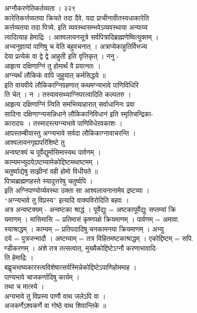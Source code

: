 \documentclass[11pt, openany]{book}
\begin{document}
{{{{{{{{{{{{{{{{{{{{{{{{{{{{{{{{{{{{{{{{{{{{{{{{{{{{{{{{{{{{{{{{{{{{{{{{{{{{{{{{{{{{{{{{{{{{{{{{{{{{{{{{{{{{{{{{{{{{{{{{{{{{{{{{{{{ }{ अग्नौकरणेतिकर्तव्यता । २२९}{\\
कारेतिकर्त्तव्यतया क्रियते तदा दैवे, यदा प्राचीनावीतस्वधाकारेति\\
कर्त्तव्यतया तदा पित्र्ये, इति व्यवस्थासम्भवेऽव्यवस्थाया अन्याय्य\\
त्वादित्याह हेमाद्रिः । आश्वलायनसूत्रे
सर्वपित्रादिब्राह्मणेष्वित्युक्तम् ।\\
अभ्यनुज्ञायां पाणिषु च वेति बहुवचनात् । अत्राप्येकाहुतिर्विभज्य\\
देया प्रत्येकं वा द्वे द्वे आहुती इति वृत्तिकृत् । ननु -\\
आहृत्य दक्षिणाग्निं तु होमार्थं वै प्रयत्नतः ।\\
अग्न्यर्थं लौकिकं वापि जुहुयात् कर्मसिद्धये ॥\\
इति वायवीये लौकिकाग्निग्रहणात् कथमग्न्यभावे पाणिविधिरि\\
ति चेत् । न । तस्यावसथ्याग्निपरत्वादिति कल्पतरु ।\\
आहृत्य दक्षिणाग्निं त्विति समभिव्याहारात् सर्वाधानिनः प्रवा\\
सादिना दक्षिणाग्न्यसन्निधाने लौकिकानिविधानं इति स्मृतिचन्द्रिका-\\
कारादयः । तस्मादस्त्यग्न्यभावे पाणिविधेरवकाशः ।\\
आपस्तम्बीयास्तु अग्न्यभावे सर्वदा लौकिकाग्नावाचरन्ति ।\\
आश्वलायनगृह्यपरिशिष्टे तु\\
अन्वष्टक्यं च पूर्वेद्युर्मासिमास्यथ पार्वणम् ।\\
काम्यमभ्युदयेऽष्टम्यामेकोद्दिष्टमथाष्टमम् ।\\
चतुर्ष्वाद्येषु साझीनां वही होमो विधीयते ॥\\
पित्र्यब्राह्मणहस्ते स्यादुत्तरेषु चतुर्ष्वपि ।\\
इति अग्निपाण्योर्व्यवस्था उक्ता सा आश्वलायनानामेव द्रष्टव्या ।\\
``अग्न्यभावे तु विप्रस्य'' इत्यादि वाक्यविरोदिति बहवः ।\\
अत्र अन्वष्टक्यम् - अन्वष्टका श्राद्धं । पूर्वेद्युः = अष्टकापूर्वेद्युः
सप्तम्यां क्रि\\
यमाणम् । मासिमासि = प्रतिमासं कृष्णपक्षे क्रियमाणम् । पार्वणम् =
अमावा.\\
स्याश्राद्धम् । काम्यम् = प्रतिपदादिषु चनकामनया क्रियमाणम् । अभ्यु\\
दये = पुत्रजन्मादौ । अष्टम्याम् = तत्र विहितमष्टकाश्राद्धम् ।
एकोद्दिष्टम् = सपि.\\
ण्डीकरणम् । अंशे तत्र तत्सत्वात्, मुख्यैकोद्दिष्टेऽग्नौ करणाभावादि-\\
ति हेमाद्रिः ।\\
बह्वृचभाष्यकारस्त्वविशेषात्सर्वस्मिन्नेकोद्दिष्टेऽपाणिहोममाह ।\\
पाण्यभावे चाजकर्णादिषु कार्यम् ।\\
तथा च मात्स्ये ।\\
अग्यभावे तु विप्रस्य पाणौ वाथ जलेऽपि वा ।\\
अजकर्णेऽश्वकर्णे वा गोष्ठे वाथ शिवान्तिके ॥\\


}}}}}}}}}}}}}}}}}}}}}}}}}}}}}}}}}}}}}}}}}}}}}}}}}}}}}}}}}}}}}}}}}}}}}}}}}}}}}}}}}}}}}}}}}}}}}}}}}}}}}}}}}}}}}}}}}}}}}}}}}}}}}}}}}}}
\end{document}
